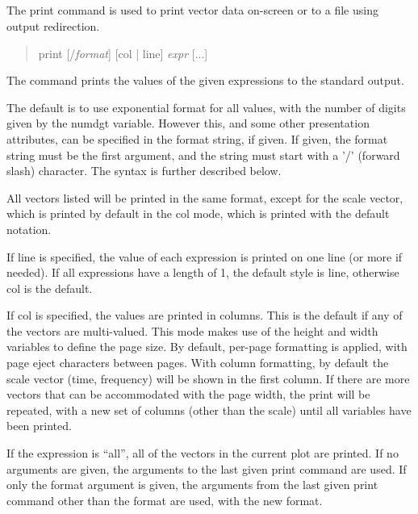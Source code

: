 \subsection{}
\label{print}


The {\cb print} command is used to print vector data on-screen or
to a file using output redirection.
\begin{quote}\vt
print [/{\it format\/}] [col | line] {\it expr\/} [...]
\end{quote}
The command prints the values of the given expressions to the standard
output.

The default is to use exponential format for all values, with the
number of digits given by the {\et numdgt} variable.  However this,
and some other presentation attributes, can be specified in the format
string, if given.  If given, the format string must be the first
argument, and the string must start with a '/' (forward slash)
character.  The syntax is further described below.

All vectors listed will be printed in the same format, except for the
scale vector, which is printed by default in the {\vt col} mode, which
is printed with the default notation.

If {\vt line} is specified, the value of each expression is printed on
one line (or more if needed).  If all expressions have a length of 1,
the default style is {\vt line}, otherwise {\vt col} is the default.

If {\vt col} is specified, the values are printed in columns.  This is
the default if any of the vectors are multi-valued.  This mode makes
use of the {\vt height} and {\vt width} variables to define the page
size.  By default, per-page formatting is applied, with page eject
characters between pages.  With column formatting, by default the
scale vector ({\et time}, {\et frequency}) will be shown in the first
column.  If there are more vectors that can be accommodated with the
page width, the print will be repeated, with a new set of columns
(other than the scale) until all variables have been printed.

If the expression is ``{\vt all}'', all of the vectors in the current
plot are printed.  If no arguments are given, the arguments to the
last given {\cb print} command are used.  If only the format argument
is given, the arguments from the last given {\cb print} command other
than the format are used, with the new format.

